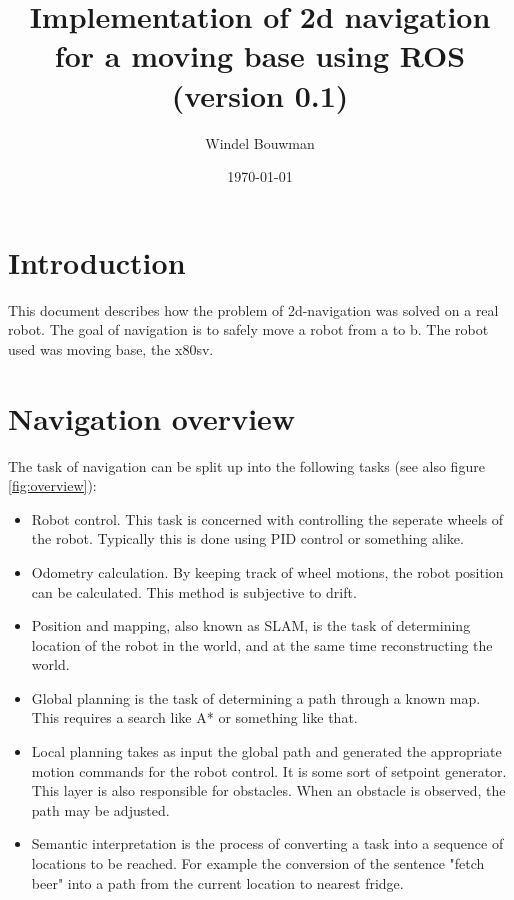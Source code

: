 \documentclass[a4paper]{article}
\begin{document}
\title{Implementation of 2d navigation for a moving base using ROS
(version 0.1)
}
\date{\today}
\author{Windel Bouwman}

\maketitle

\tableofcontents

\section{Introduction}

This document describes how the problem of 2d-navigation was solved on a real robot.
The goal of navigation is to safely move a robot from a to b. The robot used
was moving base, the x80sv.

\section{Navigation overview}

The task of navigation can be split up into the following tasks (see also figure \ref{fig:overview}):

\begin{itemize}
  \item Robot control. This task is concerned with controlling the seperate wheels of the robot. Typically this is done using PID control or something alike.
  \item Odometry calculation. By keeping track of wheel motions, the robot position can be
calculated. This method is subjective to drift.
  \item Position and mapping, also known as SLAM, is the task of determining location of the robot in the world, and at the same time reconstructing the world.
  \item Global planning is the task of determining a path through a known map. This requires a search like A* or something like that.
  \item Local planning takes as input the global path and generated the appropriate motion commands for the robot control. It is some sort of setpoint generator. This layer is also responsible for obstacles. When an obstacle is observed, the path may be adjusted.
  \item Semantic interpretation is the process of converting a task into a sequence of locations to be reached. For example the conversion of the sentence "fetch beer" into a path from the current location to nearest fridge.
\end{itemize}
\end{document}
